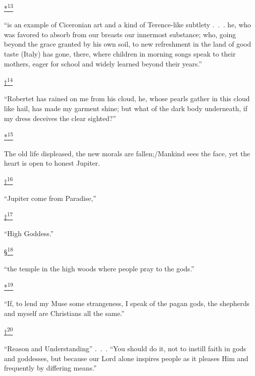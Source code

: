 \protect\hypertarget{23_NOTES.xhtmlux5cux23id_2788}{\protect\hyperlink{22_Chapter_Fourteen__THE_COMING_OF.xhtmlux5cux23id_2787}{*\textsuperscript{13}}}
``is an example of Ciceronian art and a kind of Terence-like subtlety
.~.~. he, who was favored to absorb from our breasts our innermost
substance; who, going beyond the grace granted by his own soil, to new
refreshment in the land of good taste (Italy) has gone, there, where
children in morning songs speak to their mothers, eager for school and
widely learned beyond their years.''

\protect\hypertarget{23_NOTES.xhtmlux5cux23id_2786}{\protect\hyperlink{22_Chapter_Fourteen__THE_COMING_OF.xhtmlux5cux23id_2785}{†\textsuperscript{14}}}
``Robertet has rained on me from his cloud, he, whose pearls gather in
this cloud like hail, has made my garment shine; but what of the dark
body underneath, if my dress deceives the clear sighted?''

\protect\hypertarget{23_NOTES.xhtmlux5cux23id_2784}{\protect\hyperlink{22_Chapter_Fourteen__THE_COMING_OF.xhtmlux5cux23id_2783}{*\textsuperscript{15}}}
The old life displeased, the new morals are fallen;/Mankind sees the
face, yet the heart is open to honest Jupiter.

\protect\hypertarget{23_NOTES.xhtmlux5cux23id_2782}{\protect\hyperlink{22_Chapter_Fourteen__THE_COMING_OF.xhtmlux5cux23id_2781}{†\textsuperscript{16}}}
``Jupiter come from Paradise,''

\protect\hypertarget{23_NOTES.xhtmlux5cux23id_2780}{\protect\hyperlink{22_Chapter_Fourteen__THE_COMING_OF.xhtmlux5cux23id_2779}{‡\textsuperscript{17}}}
``High Goddess.''

\protect\hypertarget{23_NOTES.xhtmlux5cux23id_2778}{\protect\hyperlink{22_Chapter_Fourteen__THE_COMING_OF.xhtmlux5cux23id_2777}{§\textsuperscript{18}}}
``the temple in the high woods where people pray to the gods.''

\protect\hypertarget{23_NOTES.xhtmlux5cux23id_2776}{\protect\hyperlink{22_Chapter_Fourteen__THE_COMING_OF.xhtmlux5cux23id_2775}{*\textsuperscript{19}}}
``If, to lend my Muse some strangeness, I speak of the pagan gods, the
shepherds and myself are Christians all the same.''

\protect\hypertarget{23_NOTES.xhtmlux5cux23id_2774}{\protect\hyperlink{22_Chapter_Fourteen__THE_COMING_OF.xhtmlux5cux23id_2773}{†\textsuperscript{20}}}
``Reason and Understanding'' .~.~. ``You should do it, not to instill
faith in gods and goddesses, but because our Lord alone inspires people
as it pleases Him and frequently by differing means.''

